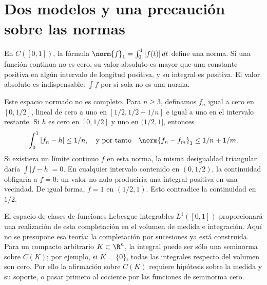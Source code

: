 \section{Dos modelos y una precaución sobre las normas}
\begin{ejemplo}\leavevmode\par
En $C([0,1])$, la fórmula $\norm{f}_1=\int_0^1|f(t)|\,dt$ define una norma. Si una función continua no es cero, su valor absoluto es mayor que una constante positiva en algún intervalo de longitud positiva, y su integral es positiva. El valor absoluto es indispensable: $\int f$ por sí sola no es una norma.

Este espacio normado no es completo. Para $n\geq3$, definamos $f_n$ igual a cero en $[0,1/2]$, lineal de cero a uno en $[1/2,1/2+1/n]$ e igual a uno en el intervalo restante. Si $h$ es cero en $[0,1/2]$ y uno en $(1/2,1]$, entonces
\[
 \int_0^1|f_n-h|\leq1/n,
 \quad\text{y por tanto}\quad
 \norm{f_n-f_m}_1\leq1/n+1/m.
\]
Si existiera un límite continuo $f$ en esta norma, la misma desigualdad triangular daría $\int|f-h|=0$. En cualquier intervalo contenido en $(0,1/2)$, la continuidad obligaría a $f=0$: un valor no nulo produciría una integral positiva en una vecindad. De igual forma, $f=1$ en $(1/2,1)$. Esto contradice la continuidad en $1/2$.

El espacio de clases de funciones Lebesgue-integrables $L^1([0,1])$ proporcionará una realización de esta completación en el volumen de medida e integración. Aquí no se presupone esa teoría: la completación por sucesiones ya está construida. Para un compacto arbitrario $K\subset\R^n$, la integral puede ser sólo una seminorma sobre $C(K)$; por ejemplo, si $K=\{0\}$, todas las integrales respecto del volumen son cero. Por ello la afirmación sobre $C(K)$ requiere hipótesis sobre la medida y su soporte, o pasar primero al cociente por las funciones de seminorma cero.
\end{ejemplo}

